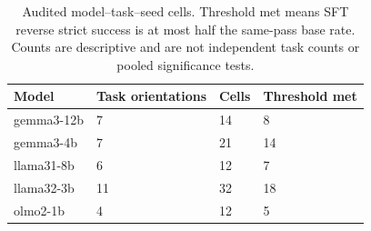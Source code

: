 \begin{table}[t]
\centering\small
\begin{tabular}{llll}
\toprule
Model & Task orientations & Cells & Threshold met \\
\midrule
gemma3-12b & 7 & 14 & 8 \\
gemma3-4b & 7 & 21 & 14 \\
llama31-8b & 6 & 12 & 7 \\
llama32-3b & 11 & 32 & 18 \\
olmo2-1b & 4 & 12 & 5 \\
\bottomrule
\end{tabular}
\caption{Audited model--task--seed cells. Threshold met means SFT reverse strict success is at most half the same-pass base rate. Counts are descriptive and are not independent task counts or pooled significance tests.}
\label{tab:core-inventory}
\end{table}
